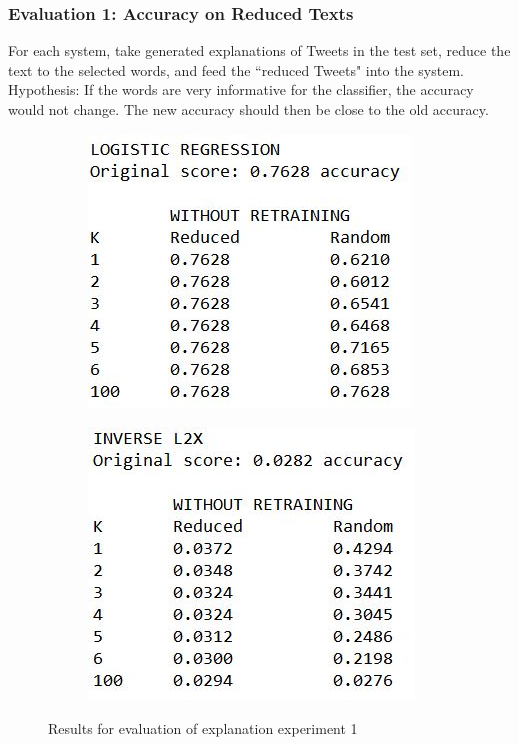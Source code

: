 \subsubsection{Evaluation 1: Accuracy on Reduced Texts}
For each system, take generated explanations of Tweets in the test set, reduce the text to the selected words, and feed the ``reduced Tweets" into the system. Hypothesis: If the words are very informative for the classifier, the accuracy would not change. The new accuracy should then be close to the old accuracy.\newline
\begin{figure}[H]
	\centering
	\begin{subfigure}[b]{0.4\textwidth}
		\includegraphics[width=\textwidth]{img/expleval1_logreg.JPG}
	\end{subfigure}
	\begin{subfigure}[b]{0.4\textwidth}
		\includegraphics[width=\textwidth]{img/expleval1_invL2X.JPG}
	\end{subfigure}
	\caption{Results for evaluation of explanation experiment 1}
	\label{fig:results_expleval1}
\end{figure}

